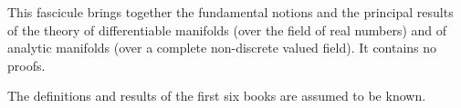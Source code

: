 
This fascicule brings together the fundamental notions and the principal results of the theory of differentiable manifolds (over the field of real numbers) and of analytic manifolds (over a complete non-discrete valued field). It contains no proofs.

The definitions and results of the first six books are assumed to be known.

